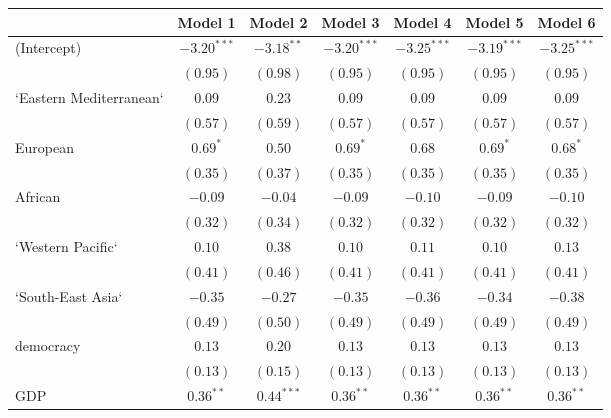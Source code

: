 
\begin{table}[!h]
\begin{center}
\begin{tabular}{l c c c c c c }
\toprule
 & Model 1 & Model 2 & Model 3 & Model 4 & Model 5 & Model 6 \\
\midrule
(Intercept)             & $-3.20^{***}$ & $-3.18^{**}$ & $-3.20^{***}$ & $-3.25^{***}$ & $-3.19^{***}$ & $-3.25^{***}$ \\
                        & $(0.95)$      & $(0.98)$     & $(0.95)$      & $(0.95)$      & $(0.95)$      & $(0.95)$      \\
`Eastern Mediterranean` & $0.09$        & $0.23$       & $0.09$        & $0.09$        & $0.09$        & $0.09$        \\
                        & $(0.57)$      & $(0.59)$     & $(0.57)$      & $(0.57)$      & $(0.57)$      & $(0.57)$      \\
European                & $0.69^{*}$    & $0.50$       & $0.69^{*}$    & $0.68$        & $0.69^{*}$    & $0.68^{*}$    \\
                        & $(0.35)$      & $(0.37)$     & $(0.35)$      & $(0.35)$      & $(0.35)$      & $(0.35)$      \\
African                 & $-0.09$       & $-0.04$      & $-0.09$       & $-0.10$       & $-0.09$       & $-0.10$       \\
                        & $(0.32)$      & $(0.34)$     & $(0.32)$      & $(0.32)$      & $(0.32)$      & $(0.32)$      \\
`Western Pacific`       & $0.10$        & $0.38$       & $0.10$        & $0.11$        & $0.10$        & $0.13$        \\
                        & $(0.41)$      & $(0.46)$     & $(0.41)$      & $(0.41)$      & $(0.41)$      & $(0.41)$      \\
`South-East Asia`       & $-0.35$       & $-0.27$      & $-0.35$       & $-0.36$       & $-0.34$       & $-0.38$       \\
                        & $(0.49)$      & $(0.50)$     & $(0.49)$      & $(0.49)$      & $(0.49)$      & $(0.49)$      \\
democracy               & $0.13$        & $0.20$       & $0.13$        & $0.13$        & $0.13$        & $0.13$        \\
                        & $(0.13)$      & $(0.15)$     & $(0.13)$      & $(0.13)$      & $(0.13)$      & $(0.13)$      \\
GDP                     & $0.36^{**}$   & $0.44^{***}$ & $0.36^{**}$   & $0.36^{**}$   & $0.36^{**}$   & $0.36^{**}$   \\

\end{tabular}
\end{center}
\end{table}
